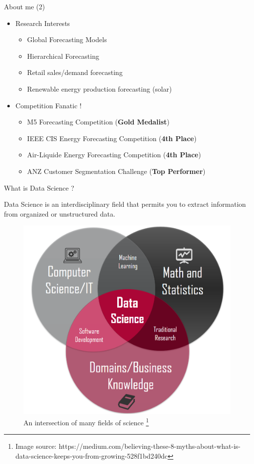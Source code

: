 \documentclass[12pt,ignorenonframetext,]{beamer}
\providecommand{\tightlist}{%
  \setlength{\itemsep}{0pt}\setlength{\parskip}{0pt}}
\begin{document}
\begin{frame}{About me (2)}
\protect\hypertarget{about-me-2}{}

\begin{itemize}
\tightlist
\item
  Research Interests

  \begin{itemize}
  \tightlist
  \item
    Global Forecasting Models
  \item
    Hierarchical Forecasting
  \item
    Retail sales/demand forecasting
  \item
    Renewable energy production forecasting (solar)
  \end{itemize}
\item
  Competition Fanatic !

  \begin{itemize}
  \tightlist
  \item
    M5 Forecasting Competition (\textbf{Gold Medalist})
  \item
    IEEE CIS Energy Forecasting Competition (\textbf{4th Place})
  \item
    Air-Liquide Energy Forecasting Competition (\textbf{4th Place})
  \item
    ANZ Customer Segmentation Challenge (\textbf{Top Performer})
  \end{itemize}
\end{itemize}

\end{frame}

\begin{frame}{What is Data Science ?}
\protect\hypertarget{what-is-data-science}{}

Data Science is an interdisciplinary field that permits you to extract
information from organized or unstructured data.

\begin{figure}
  \includegraphics[width=.5\textwidth,height=.5\textheight,keepaspectratio]{images/datascience.jpeg}
  \caption{An intersection of many fields of science%
    \footnote{%
     \tiny{Image source: https://medium.com/believing-these-8-myths-about-what-is-data-science-keeps-you-from-growing-528f1bd240dc} 
    }%
  }
\end{figure}

\end{frame}
\end{document}
